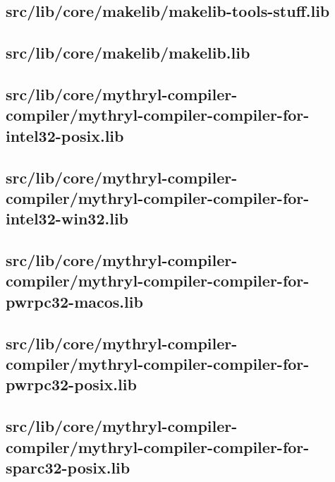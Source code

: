 \subsection{src/lib/core/makelib/makelib-tools-stuff.lib}


\subsection{src/lib/core/makelib/makelib.lib}


\subsection{src/lib/core/mythryl-compiler-compiler/mythryl-compiler-compiler-for-intel32-posix.lib}


\subsection{src/lib/core/mythryl-compiler-compiler/mythryl-compiler-compiler-for-intel32-win32.lib}


\subsection{src/lib/core/mythryl-compiler-compiler/mythryl-compiler-compiler-for-pwrpc32-macos.lib}


\subsection{src/lib/core/mythryl-compiler-compiler/mythryl-compiler-compiler-for-pwrpc32-posix.lib}


\subsection{src/lib/core/mythryl-compiler-compiler/mythryl-compiler-compiler-for-sparc32-posix.lib}


